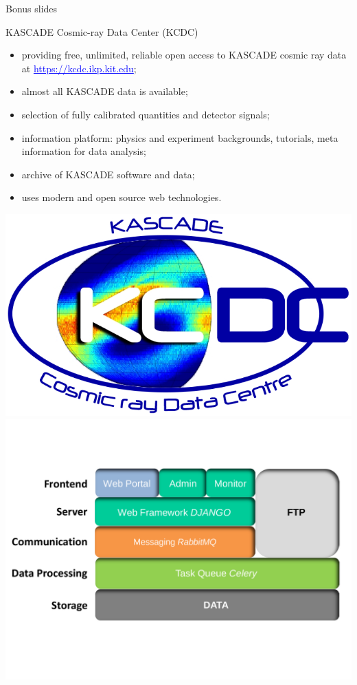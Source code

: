 
\begin{frame}
 \huge
 \center
 Bonus slides
\end{frame}




\begin{frame}{KASCADE Cosmic-ray Data Center (KCDC)}
    \begin{itemize}
        \small
        \setlength{\itemsep}{0pt}
        \item providing free, unlimited, reliable open access to KASCADE cosmic ray data at \textcolor{blue}{\underline{https://kcdc.ikp.kit.edu}};
        \item almost all KASCADE data is available;
        \item selection of fully calibrated quantities and detector signals;
        \item information platform: physics and experiment backgrounds, tutorials, meta information for data analysis;
        \item archive of KASCADE software and data;
        \item uses modern and open source web technologies.
    \end{itemize}

\includegraphics[height=0.35\textheight]{pics/KCDC-Logo.png}
\hfill
\includegraphics[height=0.35\textheight]{pics/KCDC-IT-Structure.pdf}
\end{frame}

